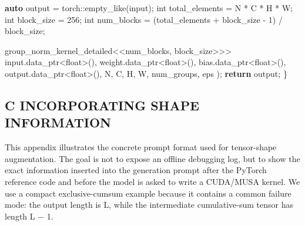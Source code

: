 \documentclass[
  10
]{article}
\newenvironment{Shaded}{}{}
\newcommand{\ControlFlowTok}[1]{\textcolor[rgb]{0.00,0.44,0.13}{\textbf{#1}}}
\newcommand{\DataTypeTok}[1]{\textcolor[rgb]{0.56,0.13,0.00}{#1}}
\newcommand{\DecValTok}[1]{\textcolor[rgb]{0.25,0.63,0.44}{#1}}
\newcommand{\KeywordTok}[1]{\textcolor[rgb]{0.00,0.44,0.13}{\textbf{#1}}}
\newcommand{\NormalTok}[1]{#1}
\newcommand{\OperatorTok}[1]{\textcolor[rgb]{0.40,0.40,0.40}{#1}}
\begin{document}
\begin{Shaded}
\begin{Highlighting}[]
    \KeywordTok{auto}\NormalTok{ output }\OperatorTok{=}\NormalTok{ torch}\OperatorTok{::}\NormalTok{empty\_like}\OperatorTok{(}\NormalTok{input}\OperatorTok{);}
    \DataTypeTok{int}\NormalTok{ total\_elements }\OperatorTok{=}\NormalTok{ N }\OperatorTok{*}\NormalTok{ C }\OperatorTok{*}\NormalTok{ H }\OperatorTok{*}\NormalTok{ W}\OperatorTok{;}
    \DataTypeTok{int}\NormalTok{ block\_size }\OperatorTok{=} \DecValTok{256}\OperatorTok{;}
    \DataTypeTok{int}\NormalTok{ num\_blocks }\OperatorTok{=} \OperatorTok{(}\NormalTok{total\_elements }\OperatorTok{+}\NormalTok{ block\_size }\OperatorTok{{-}} \DecValTok{1}\OperatorTok{)} \OperatorTok{/}\NormalTok{ block\_size}\OperatorTok{;}

\NormalTok{    group\_norm\_kernel\_detailed}\OperatorTok{\textless{}\textless{}}\NormalTok{num\_blocks}\OperatorTok{,}\NormalTok{ block\_size}\OperatorTok{\textgreater{}\textgreater{}\textgreater{}}
\NormalTok{    input}\OperatorTok{.}\NormalTok{data\_ptr}\OperatorTok{\textless{}}\DataTypeTok{float}\OperatorTok{\textgreater{}(),}
\NormalTok{    weight}\OperatorTok{.}\NormalTok{data\_ptr}\OperatorTok{\textless{}}\DataTypeTok{float}\OperatorTok{\textgreater{}(),}
\NormalTok{    bias}\OperatorTok{.}\NormalTok{data\_ptr}\OperatorTok{\textless{}}\DataTypeTok{float}\OperatorTok{\textgreater{}(),}
\NormalTok{    output}\OperatorTok{.}\NormalTok{data\_ptr}\OperatorTok{\textless{}}\DataTypeTok{float}\OperatorTok{\textgreater{}(),}
\NormalTok{    N}\OperatorTok{,}\NormalTok{ C}\OperatorTok{,}\NormalTok{ H}\OperatorTok{,}\NormalTok{ W}\OperatorTok{,}\NormalTok{ num\_groups}\OperatorTok{,}\NormalTok{ eps}
\OperatorTok{);}
\ControlFlowTok{return}\NormalTok{ output}\OperatorTok{;}
\OperatorTok{\}} 
\end{Highlighting}
\end{Shaded}

\subsection{C INCORPORATING SHAPE
INFORMATION}\label{c-incorporating-shape-information}

This appendix illustrates the concrete prompt format used for
tensor-shape augmentation. The goal is not to expose an offline
debugging log, but to show the exact information inserted into the
generation prompt after the PyTorch reference code and before the model
is asked to write a CUDA/MUSA kernel. We use a compact exclusive-cumsum
example because it contains a common failure mode: the output length is
L, while the intermediate cumulative-sum tensor has length L − 1.
\end{document}
